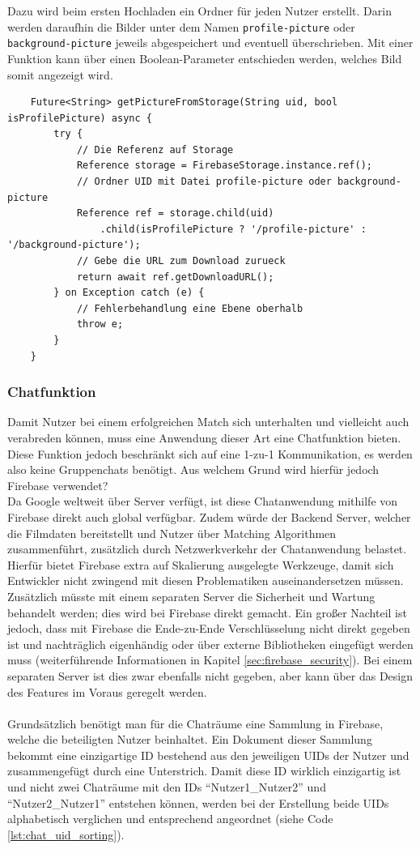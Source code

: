 Dazu wird beim ersten Hochladen ein Ordner für jeden Nutzer erstellt.
Darin werden daraufhin die Bilder unter dem Namen \texttt{profile-picture} oder \texttt{background-picture} jeweils abgespeichert und eventuell überschrieben.
Mit einer Funktion kann über einen Boolean-Parameter entschieden werden, welches Bild somit angezeigt wird.
\medspace
\begin{lstlisting}
	Future<String> getPictureFromStorage(String uid, bool isProfilePicture) async {
		try {
			// Die Referenz auf Storage
			Reference storage = FirebaseStorage.instance.ref();
			// Ordner UID mit Datei profile-picture oder background-picture
			Reference ref = storage.child(uid)
				.child(isProfilePicture ? '/profile-picture' : '/background-picture');
			// Gebe die URL zum Download zurueck
			return await ref.getDownloadURL();
		} on Exception catch (e) {
			// Fehlerbehandlung eine Ebene oberhalb
			throw e;
		}
	}
\end{lstlisting}
\medspace
\subsubsection{Chatfunktion}
Damit Nutzer bei einem erfolgreichen Match sich unterhalten und vielleicht auch verabreden können, muss eine Anwendung dieser Art eine Chatfunktion bieten.
Diese Funktion jedoch beschränkt sich auf eine 1-zu-1 Kommunikation, es werden also keine Gruppenchats benötigt.
Aus welchem Grund wird hierfür jedoch Firebase verwendet?\\

\noindent
Da Google weltweit über Server verfügt, ist diese Chatanwendung mithilfe von Firebase direkt auch global verfügbar.
Zudem würde der Backend Server, welcher die Filmdaten bereitstellt und Nutzer über Matching Algorithmen zusammenführt, zusätzlich durch Netzwerkverkehr der Chatanwendung belastet.
Hierfür bietet Firebase extra auf Skalierung ausgelegte Werkzeuge, damit sich Entwickler nicht zwingend mit diesen Problematiken auseinandersetzen müssen.
Zusätzlich müsste mit einem separaten Server die Sicherheit und Wartung behandelt werden; dies wird bei Firebase direkt gemacht.
Ein großer Nachteil ist jedoch, dass mit Firebase die Ende-zu-Ende Verschlüsselung nicht direkt gegeben ist und nachträglich eigenhändig oder über externe Bibliotheken eingefügt werden muss (weiterführende Informationen in Kapitel \ref{sec:firebase_security}).
Bei einem separaten Server ist dies zwar ebenfalls nicht gegeben, aber kann über das Design des Features im Voraus geregelt werden.\\
\\
\noindent
Grundsätzlich benötigt man für die Chaträume eine Sammlung in Firebase, welche die beteiligten Nutzer beinhaltet. 
Ein Dokument dieser Sammlung bekommt eine einzigartige ID bestehend aus den jeweiligen UIDs der Nutzer und zusammengefügt durch eine Unterstrich.
Damit diese ID wirklich einzigartig ist und nicht zwei Chaträume mit den IDs \enquote{Nutzer1\_Nutzer2} und \enquote{Nutzer2\_Nutzer1} entstehen können, werden bei der Erstellung beide UIDs alphabetisch verglichen und entsprechend angeordnet (siehe Code \ref{lst:chat_uid_sorting}).\\

